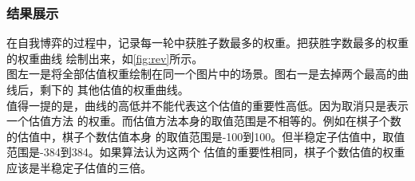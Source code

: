 \documentclass[a4paper]{article}
\begin{document}
\subsubsection{结果展示}
在自我博弈的过程中，记录每一轮中获胜子数最多的权重。把获胜字数最多的权重的权重曲线
绘制出来，如\autoref{fig:rev}所示。\\

图左一是将全部估值权重绘制在同一个图片中的场景。图右一是去掉两个最高的曲线后，剩下的
其他估值的权重曲线。\\

值得一提的是，曲线的高低并不能代表这个估值的重要性高低。因为取消只是表示一个估值方法
的权重。而估值方法本身的取值范围是不相等的。例如在棋子个数的估值中，棋子个数估值本身
的取值范围是-100到100。但半稳定子估值中，取值范围是-384到384。如果算法认为这两个
估值的重要性相同，棋子个数估值的权重应该是半稳定子估值的三倍。\\
\end{document}
